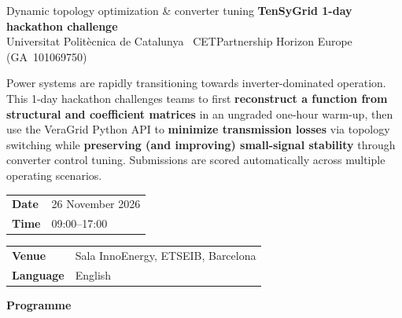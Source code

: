 \documentclass[11pt,a4paper]{article}
\newcommand{\eventdate}{26 November 2026}
\newcommand{\eventtime}{09:00--17:00}
\newcommand{\eventvenue}{Sala InnoEnergy, ETSEIB, Barcelona}
\newcommand{\eventlanguage}{English}
\begin{document}

{Dynamic topology optimization \& converter tuning}
{\textbf{TenSyGrid 1-day hackathon challenge}\\[1pt]
{\footnotesize \color{tggrey}Universitat Polit\`ecnica de Catalunya \textperiodcentered\ CETPartnership Horizon Europe \mbox{(GA 101069750)}}}

\small
Power systems are rapidly transitioning towards inverter-dominated operation. This 1-day hackathon challenges teams
to first \textbf{reconstruct a function from structural and coefficient matrices} in an ungraded one-hour warm-up, then use the VeraGrid Python API to \textbf{minimize transmission losses} via topology switching while \textbf{preserving (and improving)
  small-signal stability} through converter control tuning. Submissions are scored automatically across multiple operating scenarios.

\vspace{6pt}

\normalsize
\begin{minipage}[t]{0.48\textwidth}
  \renewcommand{\arraystretch}{1.25}
  \begin{tabularx}{\textwidth}{@{}lX@{}}
    \textbf{\color{tgblue}Date} & \eventdate \\
    \textbf{\color{tgblue}Time} & \eventtime \\
  \end{tabularx}
\end{minipage}
\hfill
\begin{minipage}[t]{0.48\textwidth}
  \renewcommand{\arraystretch}{1.25}
  \begin{tabularx}{\textwidth}{@{}lX@{}}
    \textbf{\color{tgblue}Venue}    & \eventvenue    \\
    \textbf{\color{tgblue}Language} & \eventlanguage \\
  \end{tabularx}
\end{minipage}

\vspace{10pt}
{\large\bfseries\color{tgblue}Programme}\par
\vspace{4pt}
\end{document}
